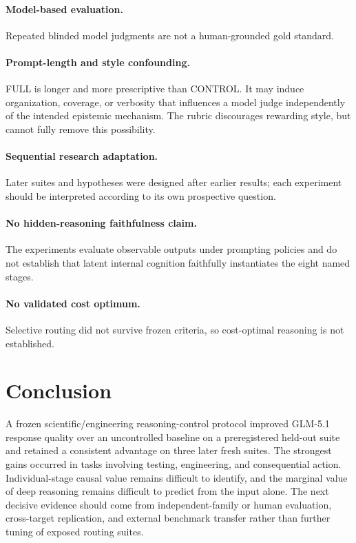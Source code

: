 \documentclass[11pt]{article}
\begin{document}
\paragraph{Model-based evaluation.} Repeated blinded model judgments are not a human-grounded gold standard.

\paragraph{Prompt-length and style confounding.} FULL is longer and more prescriptive than CONTROL. It may induce organization, coverage, or verbosity that influences a model judge independently of the intended epistemic mechanism. The rubric discourages rewarding style, but cannot fully remove this possibility.

\paragraph{Sequential research adaptation.} Later suites and hypotheses were designed after earlier results; each experiment should be interpreted according to its own prospective question.

\paragraph{No hidden-reasoning faithfulness claim.} The experiments evaluate observable outputs under prompting policies and do not establish that latent internal cognition faithfully instantiates the eight named stages.

\paragraph{No validated cost optimum.} Selective routing did not survive frozen criteria, so cost-optimal reasoning is not established.

\section{Conclusion}
A frozen scientific/engineering reasoning-control protocol improved GLM-5.1 response quality over an uncontrolled baseline on a preregistered held-out suite and retained a consistent advantage on three later fresh suites. The strongest gains occurred in tasks involving testing, engineering, and consequential action. Individual-stage causal value remains difficult to identify, and the marginal value of deep reasoning remains difficult to predict from the input alone. The next decisive evidence should come from independent-family or human evaluation, cross-target replication, and external benchmark transfer rather than further tuning of exposed routing suites.
\end{document}
